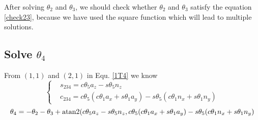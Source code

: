 \documentclass[utf8]{article}
\begin{document}
After solving $\theta_2$ and $\theta_3$, we should check whether $\theta_2$ and $\theta_3$ satisfy the equation \ref{check23}, because we have used the square function which will lead to multiple solutions.


\subsection{Solve $\theta_4$}
From $(1, 1)$ and $(2, 1)$ in Equ. \ref{1T4} we know
$$\left\{
\begin{aligned}
&s_{234} = c\theta_5a_z - s\theta_5n_z\\
&c_{234} = c\theta_5(c\theta_1a_x +s\theta_1a_y) - s\theta_5(c\theta_1n_x + s\theta_1n_y)
\end{aligned}
\right.$$
\begin{equation}
\theta_4 = -\theta_2 - \theta_3 + {\rm atan2}(c\theta_5a_z - s\theta_5n_z, c\theta_5(c\theta_1a_x +s\theta_1a_y) - s\theta_5(c\theta_1n_x + s\theta_1n_y)
\end{equation}
\end{document}
